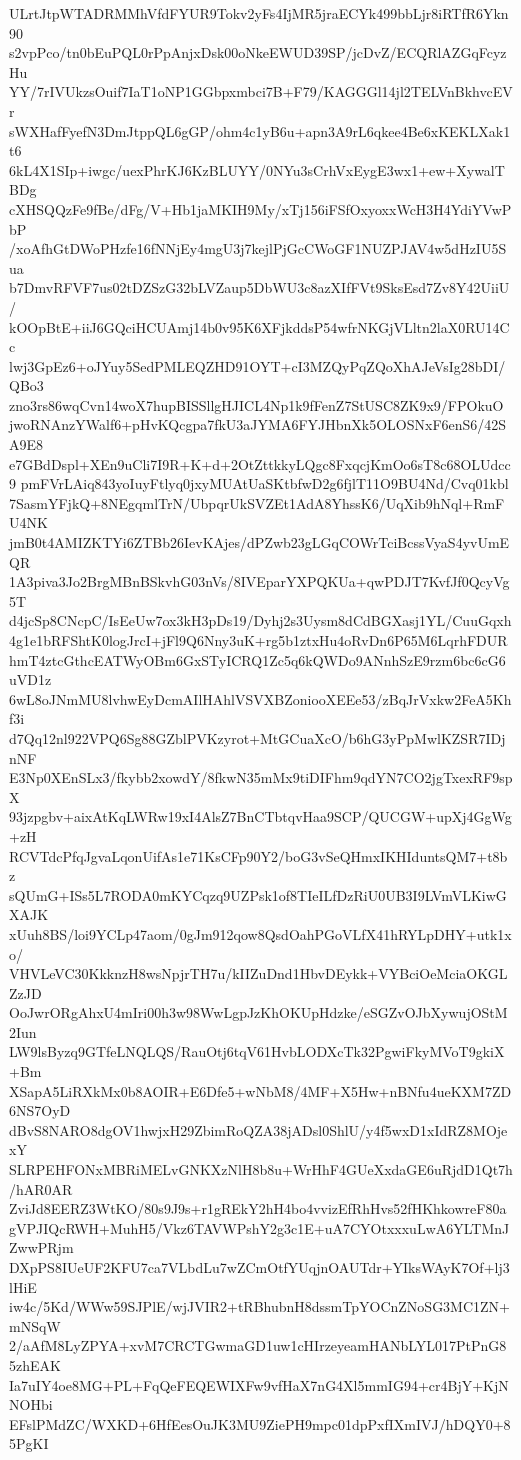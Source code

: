 ULrtJtpWTADRMMhVfdFYUR9Tokv2yFs4IjMR5jraECYk499bbLjr8iRTfR6Ykn90
s2vpPco/tn0bEuPQL0rPpAnjxDsk00oNkeEWUD39SP/jcDvZ/ECQRlAZGqFcyzHu
YY/7rIVUkzsOuif7IaT1oNP1GGbpxmbci7B+F79/KAGGGl14jl2TELVnBkhvcEVr
sWXHafFyefN3DmJtppQL6gGP/ohm4c1yB6u+apn3A9rL6qkee4Be6xKEKLXak1t6
6kL4X1SIp+iwgc/uexPhrKJ6KzBLUYY/0NYu3sCrhVxEygE3wx1+ew+XywalTBDg
cXHSQQzFe9fBe/dFg/V+Hb1jaMKIH9My/xTj156iFSfOxyoxxWcH3H4YdiYVwPbP
/xoAfhGtDWoPHzfe16fNNjEy4mgU3j7kejlPjGcCWoGF1NUZPJAV4w5dHzIU5Sua
b7DmvRFVF7us02tDZSzG32bLVZaup5DbWU3c8azXIfFVt9SksEsd7Zv8Y42UiiU/
kOOpBtE+iiJ6GQciHCUAmj14b0v95K6XFjkddsP54wfrNKGjVLltn2laX0RU14Cc
lwj3GpEz6+oJYuy5SedPMLEQZHD91OYT+cI3MZQyPqZQoXhAJeVsIg28bDI/QBo3
zno3rs86wqCvn14woX7hupBISSllgHJICL4Np1k9fFenZ7StUSC8ZK9x9/FPOkuO
jwoRNAnzYWalf6+pHvKQcgpa7fkU3aJYMA6FYJHbnXk5OLOSNxF6enS6/42SA9E8
e7GBdDspl+XEn9uCli7I9R+K+d+2OtZttkkyLQgc8FxqcjKmOo6sT8c68OLUdcc9
pmFVrLAiq843yoIuyFtlyq0jxyMUAtUaSKtbfwD2g6fjlT11O9BU4Nd/Cvq01kbl
7SasmYFjkQ+8NEgqmlTrN/UbpqrUkSVZEt1AdA8YhssK6/UqXib9hNql+RmFU4NK
jmB0t4AMIZKTYi6ZTBb26IevKAjes/dPZwb23gLGqCOWrTciBcssVyaS4yvUmEQR
1A3piva3Jo2BrgMBnBSkvhG03nVs/8IVEparYXPQKUa+qwPDJT7KvfJf0QcyVg5T
d4jcSp8CNcpC/IsEeUw7ox3kH3pDs19/Dyhj2s3Uysm8dCdBGXasj1YL/CuuGqxh
4g1e1bRFShtK0logJrcI+jFl9Q6Nny3uK+rg5b1ztxHu4oRvDn6P65M6LqrhFDUR
hmT4ztcGthcEATWyOBm6GxSTyICRQ1Zc5q6kQWDo9ANnhSzE9rzm6bc6cG6uVD1z
6wL8oJNmMU8lvhwEyDcmAIlHAhlVSVXBZoniooXEEe53/zBqJrVxkw2FeA5Khf3i
d7Qq12nl922VPQ6Sg88GZblPVKzyrot+MtGCuaXcO/b6hG3yPpMwlKZSR7IDjnNF
E3Np0XEnSLx3/fkybb2xowdY/8fkwN35mMx9tiDIFhm9qdYN7CO2jgTxexRF9spX
93jzpgbv+aixAtKqLWRw19xI4AlsZ7BnCTbtqvHaa9SCP/QUCGW+upXj4GgWg+zH
RCVTdcPfqJgvaLqonUifAs1e71KsCFp90Y2/boG3vSeQHmxIKHIduntsQM7+t8bz
sQUmG+ISs5L7RODA0mKYCqzq9UZPsk1of8TIeILfDzRiU0UB3I9LVmVLKiwGXAJK
xUuh8BS/loi9YCLp47aom/0gJm912qow8QsdOahPGoVLfX41hRYLpDHY+utk1xo/
VHVLeVC30KkknzH8wsNpjrTH7u/kIIZuDnd1HbvDEykk+VYBciOeMciaOKGLZzJD
OoJwrORgAhxU4mIri00h3w98WwLgpJzKhOKUpHdzke/eSGZvOJbXywujOStM2Iun
LW9lsByzq9GTfeLNQLQS/RauOtj6tqV61HvbLODXcTk32PgwiFkyMVoT9gkiX+Bm
XSapA5LiRXkMx0b8AOIR+E6Dfe5+wNbM8/4MF+X5Hw+nBNfu4ueKXM7ZD6NS7OyD
dBvS8NARO8dgOV1hwjxH29ZbimRoQZA38jADsl0ShlU/y4f5wxD1xIdRZ8MOjexY
SLRPEHFONxMBRiMELvGNKXzNlH8b8u+WrHhF4GUeXxdaGE6uRjdD1Qt7h/hAR0AR
ZviJd8EERZ3WtKO/80s9J9s+r1gREkY2hH4bo4vvizEfRhHvs52fHKhkowreF80a
gVPJIQcRWH+MuhH5/Vkz6TAVWPshY2g3c1E+uA7CYOtxxxuLwA6YLTMnJZwwPRjm
DXpPS8IUeUF2KFU7ca7VLbdLu7wZCmOtfYUqjnOAUTdr+YIksWAyK7Of+lj3lHiE
iw4c/5Kd/WWw59SJPlE/wjJVIR2+tRBhubnH8dssmTpYOCnZNoSG3MC1ZN+mNSqW
2/aAfM8LyZPYA+xvM7CRCTGwmaGD1uw1cHIrzeyeamHANbLYL017PtPnG85zhEAK
Ia7uIY4oe8MG+PL+FqQeFEQEWIXFw9vfHaX7nG4Xl5mmIG94+cr4BjY+KjNNOHbi
EFslPMdZC/WXKD+6HfEesOuJK3MU9ZiePH9mpc01dpPxfIXmIVJ/hDQY0+85PgKI
